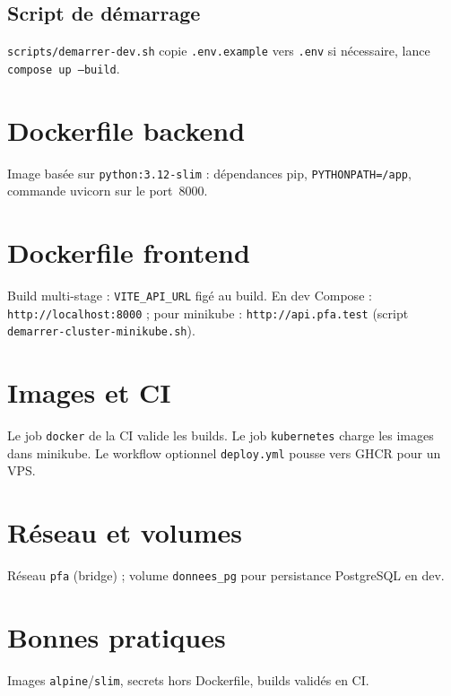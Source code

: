\subsection{Script de démarrage}

\texttt{scripts/demarrer-dev.sh} copie \texttt{.env.example} vers \texttt{.env} si nécessaire, lance \texttt{compose up --build}.

\section{Dockerfile backend}

Image basée sur \texttt{python:3.12-slim} : dépendances pip, \texttt{PYTHONPATH=/app}, commande uvicorn sur le port~8000.

\section{Dockerfile frontend}

Build multi-stage : \texttt{VITE\_API\_URL} figé au build. En dev Compose : \texttt{http://localhost:8000} ; pour minikube : \texttt{http://api.pfa.test} (script \texttt{demarrer-cluster-minikube.sh}).

\section{Images et CI}

Le job \texttt{docker} de la CI valide les builds. Le job \texttt{kubernetes} charge les images dans minikube. Le workflow optionnel \texttt{deploy.yml} pousse vers GHCR pour un VPS.

\section{Réseau et volumes}

Réseau \texttt{pfa} (bridge) ; volume \texttt{donnees\_pg} pour persistance PostgreSQL en dev.

\section{Bonnes pratiques}

Images \texttt{alpine}/\texttt{slim}, secrets hors Dockerfile, builds validés en CI.
